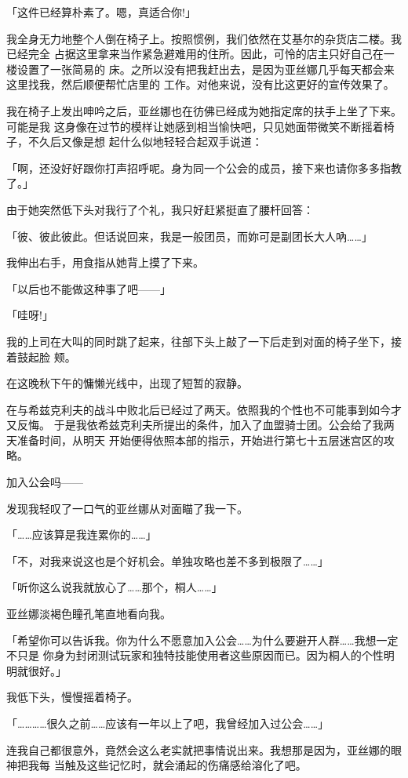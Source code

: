 \documentclass[11pt]{book}
\begin{document}
「这件已经算朴素了。嗯，真适合你!」

我全身无力地整个人倒在椅子上。按照惯例，我们依然在艾基尔的杂货店二楼。我已经完全
占据这里拿来当作紧急避难用的住所。因此，可怜的店主只好自己在一楼设置了一张简易的
床。之所以没有把我赶出去，是因为亚丝娜几乎每天都会来这里找我，然后顺便帮忙店里的
工作。对他来说，没有比这更好的宣传效果了。

我在椅子上发出呻吟之后，亚丝娜也在彷佛已经成为她指定席的扶手上坐了下来。可能是我
这身像在过节的模样让她感到相当愉快吧，只见她面带微笑不断摇着椅子，不久后又像是想
起什么似地轻轻合起双手说道：

「啊，还没好好跟你打声招呼呢。身为同一个公会的成员，接下来也请你多多指教了。」

由于她突然低下头对我行了个礼，我只好赶紧挺直了腰杆回答：

「彼、彼此彼此。但话说回来，我是一般团员，而妳可是副团长大人吶……」

我伸出右手，用食指从她背上摸了下来。

「以后也不能做这种事了吧——」

「哇呀!」

我的上司在大叫的同时跳了起来，往部下头上敲了一下后走到对面的椅子坐下，接着鼓起脸
颊。

在这晚秋下午的慵懒光线中，出现了短暂的寂静。

在与希兹克利夫的战斗中败北后已经过了两天。依照我的个性也不可能事到如今才又反悔。
于是我依希兹克利夫所提出的条件，加入了血盟骑士团。公会给了我两天准备时间，从明天
开始便得依照本部的指示，开始进行第七十五层迷宫区的攻略。

加入公会吗——

发现我轻叹了一口气的亚丝娜从对面瞄了我一下。

「……应该算是我连累你的……」

「不，对我来说这也是个好机会。单独攻略也差不多到极限了……」

「听你这么说我就放心了……那个，桐人……」

亚丝娜淡褐色瞳孔笔直地看向我。

「希望你可以告诉我。你为什么不愿意加入公会……为什么要避开人群……我想一定不只是
你身为封闭测试玩家和独特技能使用者这些原因而已。因为桐人的个性明明就很好。」

我低下头，慢慢摇着椅子。

「…………很久之前……应该有一年以上了吧，我曾经加入过公会……」

连我自己都很意外，竟然会这么老实就把事情说出来。我想那是因为，亚丝娜的眼神把我每
当触及这些记忆时，就会涌起的伤痛感给溶化了吧。
\end{document}

